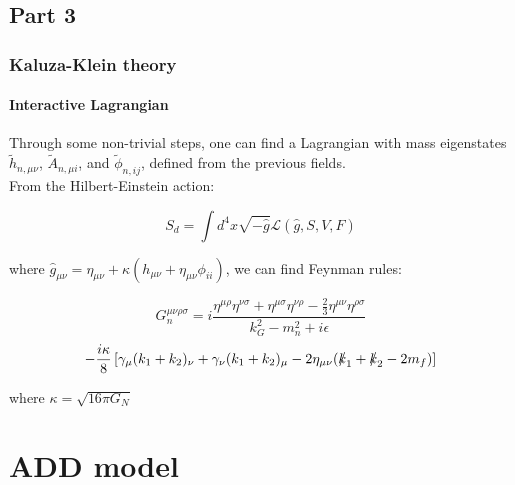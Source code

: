 \documentclass[10pt]{beamer}
\begin{document}
	\subsection{Part 3}
	\begin{frame}
		\frametitle{Kaluza-Klein theory}
		\framesubtitle{Interactive Lagrangian}
		Through some non-trivial steps, one can find a Lagrangian with mass eigenstates $\tilde{h}_{n,\mu\nu}$, $\tilde{A}_{n,\mu i}$, and $\tilde{\phi}_{n,ij}$, defined from the previous fields.\\
		
		From the Hilbert-Einstein action:
		
		\begin{equation}
			S_d = \int d^4x \sqrt{-\hat{g}}\mathcal{L}(\hat{g},S,V,F)
		\end{equation}
		
		where $\hat{g}_{\mu\nu} = \eta_{\mu\nu} + \kappa(h_{\mu\nu} + \eta_{\mu\nu}\phi_{ii})$, we can find Feynman rules:
		
		\begin{equation}
			G_n^{\mu\nu\rho\sigma} = i\frac{\eta^{\mu\rho}\eta^{\nu\sigma} + \eta^{\mu\sigma}\eta^{\nu\rho} - \frac{2}{3}\eta^{\mu\nu}\eta^{\rho\sigma}}{k_G^2 - m_n^2 + i\epsilon}
		\end{equation}
		\begin{equation}
			-\frac{i\kappa}{8}\left[\gamma_\mu(k_1 + k_2)_ \nu + \gamma_\nu(k_1+k_2)_\mu - 2\eta_{\mu\nu}(\slashed k_1 + \slashed k_2 - 2m_f)\right]
		\end{equation}
		
		where $\kappa = \sqrt{16\pi G_N}$
		
	\end{frame}
	
	\section{ADD model}
\end{document}
